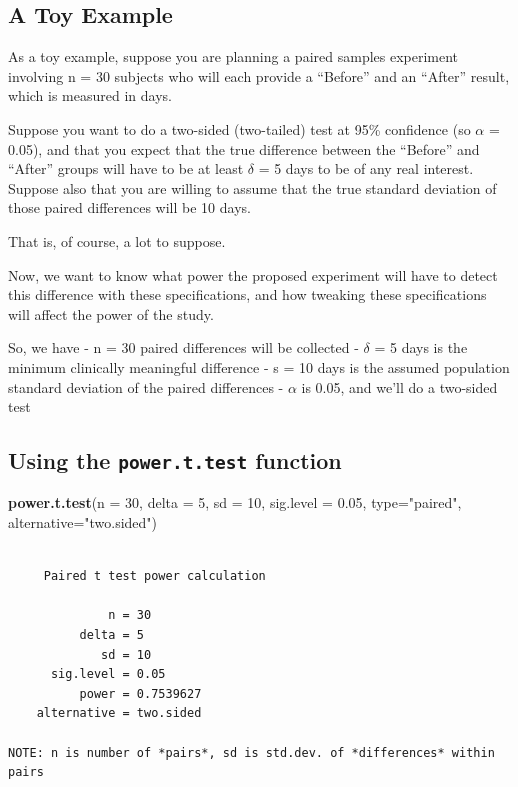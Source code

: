 \documentclass[
]{book}
\newenvironment{Shaded}{\begin{snugshade}}{\end{snugshade}}
\newcommand{\DataTypeTok}[1]{\textcolor[rgb]{0.13,0.29,0.53}{#1}}
\newcommand{\DecValTok}[1]{\textcolor[rgb]{0.00,0.00,0.81}{#1}}
\newcommand{\FloatTok}[1]{\textcolor[rgb]{0.00,0.00,0.81}{#1}}
\newcommand{\KeywordTok}[1]{\textcolor[rgb]{0.13,0.29,0.53}{\textbf{#1}}}
\newcommand{\NormalTok}[1]{#1}
\newcommand{\StringTok}[1]{\textcolor[rgb]{0.31,0.60,0.02}{#1}}
\begin{document}
\hypertarget{a-toy-example-1}{%
\subsection{A Toy Example}\label{a-toy-example-1}}

As a toy example, suppose you are planning a paired samples experiment involving n = 30 subjects who will each provide a ``Before'' and an ``After'' result, which is measured in days.

Suppose you want to do a two-sided (two-tailed) test at 95\% confidence (so \(\alpha\) = 0.05), and that you expect that the true difference between the ``Before'' and ``After'' groups will have to be at least \(\delta\) = 5 days to be of any real interest. Suppose also that you are willing to assume that the true standard deviation of those paired differences will be 10 days.

That is, of course, a lot to suppose.

Now, we want to know what power the proposed experiment will have to detect this difference with these specifications, and how tweaking these specifications will affect the power of the study.

So, we have
- n = 30 paired differences will be collected
- \(\delta\) = 5 days is the minimum clinically meaningful difference
- s = 10 days is the assumed population standard deviation of the paired differences
- \(\alpha\) is 0.05, and we'll do a two-sided test

\hypertarget{using-the-power.t.test-function-1}{%
\subsection{\texorpdfstring{Using the \texttt{power.t.test} function}{Using the power.t.test function}}\label{using-the-power.t.test-function-1}}

\begin{Shaded}
\begin{Highlighting}[]
\KeywordTok{power.t.test}\NormalTok{(}\DataTypeTok{n =} \DecValTok{30}\NormalTok{, }\DataTypeTok{delta =} \DecValTok{5}\NormalTok{, }\DataTypeTok{sd =} \DecValTok{10}\NormalTok{, }\DataTypeTok{sig.level =} \FloatTok{0.05}\NormalTok{, }
             \DataTypeTok{type=}\StringTok{"paired"}\NormalTok{, }\DataTypeTok{alternative=}\StringTok{"two.sided"}\NormalTok{)}
\end{Highlighting}
\end{Shaded}

\begin{verbatim}

     Paired t test power calculation 

              n = 30
          delta = 5
             sd = 10
      sig.level = 0.05
          power = 0.7539627
    alternative = two.sided

NOTE: n is number of *pairs*, sd is std.dev. of *differences* within pairs
\end{verbatim}
\end{document}
